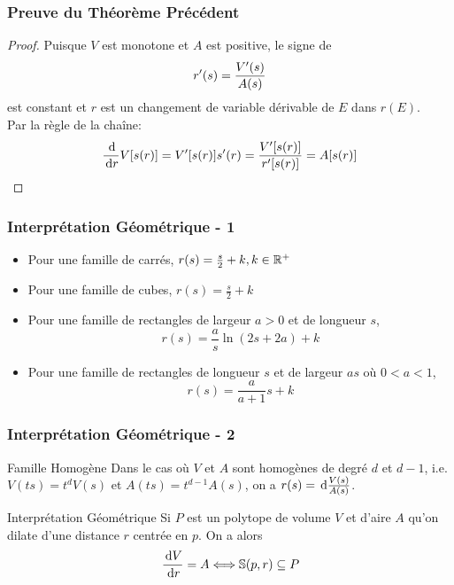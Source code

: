 \documentclass{../beamercours}
\begin{document}
\begin{frame}
    \frametitle{Preuve du Théorème Précédent}
    \begin{proof}
        Puisque $V$ est monotone et $A$ est positive, le signe de \vspace{-5pt}
        \begin{equation*}
            r'(s) = \frac{V'(s)}{A(s)}\vspace{-5pt}
        \end{equation*}
        est constant et $r$ est un changement de variable dérivable de $E$ dans $r(E)$.\\
        Par la règle de la chaîne: 
        \vspace{-5pt}
        \begin{equation*}
            \frac{\d}{\d r}V[s(r)] = V'[s(r)]s'(r) = \frac{V'[s(r)]}{r'[s(r)]} = A[s(r)]\vspace{-5pt}
        \end{equation*}
    \end{proof}
\end{frame}

\begin{frame}
    \frametitle{Interprétation Géométrique - 1}
    \begin{itemize}[<+->]
        \item Pour une famille de carrés, $r(s) = \frac{s}{2} + k,  k \in \mathbb{R}^{+}$
        \item Pour une famille de cubes, $r(s) = \frac{s}{2} + k$
        \item Pour une famille de rectangles de largeur $a > 0$ et de longueur $s$, \[r(s) = \frac{a}{s}\ln(2s + 2a) + k\]
        \item Pour une famille de rectangles de longueur $s$ et de largeur $as$ où $0 < a < 1$, \[r(s) = \frac{a}{a + 1}s + k\]
    \end{itemize}
\end{frame}

\begin{frame}
    \frametitle{Interprétation Géométrique - 2}
    \begin{théorème}
        {Famille Homogène}{}
        Dans le cas où $V$ et $A$ sont homogènes de degré $d$ et $d - 1$, i.e. $V(ts) = t^{d}V(s)$ et $A(ts) = t^{d-1}A(s)$, on a $r(s) = {\rm \, d} \frac{V(s)}{A(s)}$.
    \end{théorème}

    \begin{théorème}
        {Interprétation Géométrique}{}
        Si $P$ est un polytope de volume $V$ et d'aire $A$ qu'on dilate d'une distance $r$ centrée en $p$. On a alors \vspace{-5pt}
        \begin{equation*}
            \frac{\d V}{\d r} = A \Longleftrightarrow \mathbb{S}(p, r) \subseteq P\vspace{-3pt}
        \end{equation*}
    \end{théorème}
\end{frame}
\end{document}
